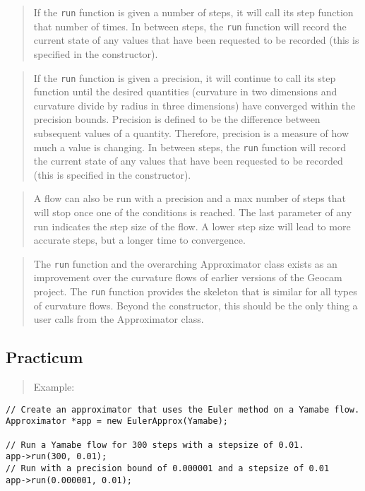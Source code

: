 \documentclass[10pt]{article}%
\begin{document}
\begin{quotation} If the \texttt{run} function is given a number of steps, it will call its step function that number of times. In between steps, the \texttt{run} function will record the current state of any values that have been requested to be recorded (this is specified in the constructor).\end{quotation}
\begin{quotation} If the \texttt{run} function is given a precision, it will continue to call its step function until the desired quantities (curvature in two dimensions and curvature divide by radius in three dimensions) have converged within the precision bounds. Precision is defined to be the difference between subsequent values of a quantity. Therefore, precision is a measure of how much a value is changing. In between steps, the \texttt{run} function will record the current state of any values that have been requested to be recorded (this is specified in the constructor).        \end{quotation}
\begin{quotation} A flow can also be run with a precision and a max number of steps that will stop once one of the conditions is reached. The last parameter of any run indicates the step size of the flow. A lower step size will lead to more accurate steps, but a longer time to convergence.\end{quotation}
\begin{quotation} The \texttt{run} function and the overarching Approximator class exists as an improvement over the curvature flows of earlier versions of the Geocam project. The \texttt{run} function provides the skeleton that is similar for all types of curvature flows. Beyond the constructor, this should be the only thing a user calls from the Approximator class.\end{quotation}

\subsection*{Practicum}

\begin{quotation} Example:\end{quotation}{\small{\begin{verbatim} 
// Create an approximator that uses the Euler method on a Yamabe flow.
Approximator *app = new EulerApprox(Yamabe);

// Run a Yamabe flow for 300 steps with a stepsize of 0.01.
app->run(300, 0.01);
// Run with a precision bound of 0.000001 and a stepsize of 0.01
app->run(0.000001, 0.01);
\end{verbatim}
}}
\end{document}
